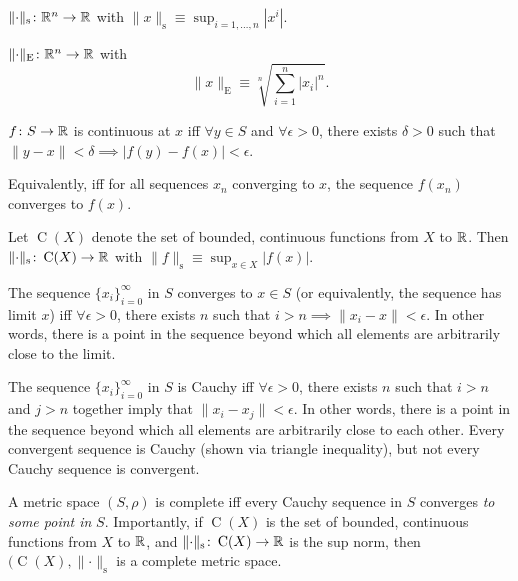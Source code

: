 \documentclass[8pt,letterpaper, landscape]{extarticle} %
\begin{document}
\begin{multicols}{3}
\begin{description}
 $ \lVert \cdot \rVert_{\operatorname{s}} \colon \mathbb{R}^n \to \mathbb{R} $ with $ \lVert x \rVert_{\operatorname{s}} \equiv \sup_{i=1, \dotsc , n} |x^i| $.

 $ \lVert \cdot \rVert_{\operatorname{E}} \colon \mathbb{R}^n \to \mathbb{R} $ with
$$ \lVert x \rVert_{\operatorname{E}} \equiv \sqrt[n]{\sum_{i=1}^{n} |x_i|^n} . $$

 $ f \colon S \to \mathbb{R} $ is continuous at $ x $ iff $ \forall y \in S $ and $ \forall \epsilon > 0 $, there exists $ \delta > 0 $ such that $ \lVert y - x \rVert < \delta \implies |f(y) - f(x)| < \epsilon $.

Equivalently, iff for all sequences $ x_n $ converging to $ x $, the sequence $ f(x_n) $ converges to $ f(x) $.

 Let $ \operatorname{C}(X) $ denote the set of bounded, continuous functions from $ X $ to $ \mathbb{R} $. Then $ \lVert \cdot \rVert_{\operatorname{s}} \colon \operatorname{C}(X) \to \mathbb{R} $ with $ \lVert f \rVert_{\operatorname{s}} \equiv \sup_{x \in X} |f(x)| $.

 The sequence $ \{ x_i \}_{i=0}^{\infty} $ in $ S $ converges to $ x \in S $ (or equivalently, the  sequence has limit $ x $) iff $ \forall \epsilon > 0 $, there exists $ n $ such that $ i > n \implies \lVert x_i - x \rVert < \epsilon $. In other words, there is a point in the sequence beyond which all elements are arbitrarily close to the limit.

 The sequence $ \{ x_i \}_{i=0}^{\infty} $ in $ S $ is Cauchy iff $ \forall \epsilon > 0 $, there exists $ n $ such that $ i > n $ and $ j > n $ together imply that $ \lVert x_i - x_j \rVert < \epsilon $. In other words, there is a point in the sequence beyond which all elements are arbitrarily close to each other. Every convergent sequence is Cauchy (shown via triangle inequality), but not every Cauchy sequence is convergent.

 A metric space $ (S, \rho) $ is complete iff every Cauchy sequence in $ S $ converges \textit{to some point in} $ S $. Importantly, if $ \operatorname{C}(X) $ is the set of bounded, continuous functions from $ X $ to $ \mathbb{R} $, and $ \lVert \cdot \rVert_{\operatorname{s}} \colon \operatorname{C}(X) \to \mathbb{R} $ is the sup norm, then $ (\operatorname{C}(X), \lVert \cdot \rVert_{\operatorname{s}} $ is a complete metric space.


\end{description}
\end{multicols}
\end{document}
